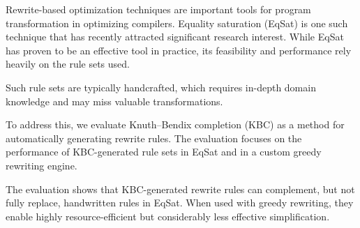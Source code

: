 \label{chap:abstract}

Rewrite-based optimization techniques are important tools for program transformation in optimizing compilers. Equality saturation (EqSat) is one such technique that has recently attracted significant research interest. While EqSat has proven to be an effective tool in practice, its feasibility and performance rely heavily on the rule sets used. 

Such rule sets are typically handcrafted, which requires in-depth domain knowledge and may miss valuable transformations.
 
To address this, we evaluate Knuth–Bendix completion (KBC) as a method for automatically generating rewrite rules. The evaluation focuses on the performance of KBC-generated rule sets in EqSat and in a custom greedy rewriting engine.
 
The evaluation shows that KBC-generated rewrite rules can complement, but not fully replace, handwritten rules in EqSat. When used with greedy rewriting, they enable highly resource-efficient but considerably less effective simplification.